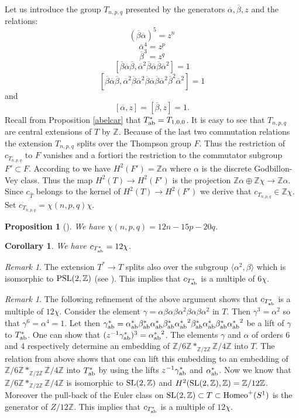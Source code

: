 \documentclass[twoside]{irmaems}
\theoremstyle{plain}
\newtheorem{corollary}[theorem]{Corollary}
\newtheorem{proposition}[theorem]{Proposition}
\theoremstyle{definition}
\theoremstyle{remark}
\newtheorem{remark}[theorem]{Remark}
\newcommand{\Z}{{\mathbb{Z}}}
\newcommand{\als}{{\overline{\alpha}}}
\newcommand{\bls}{{\overline{\beta}}}
\begin{document}
\vspace{0.2cm}
\noindent
Let us introduce the group $T_{n,p,q}$ presented by  the generators  
$\als, \bls, z$ and the relations: 
\[ (\bls\als)^5=z^n \]  
\[ \als^4=z^p \]
\[ \bls^3=z^q\]
\[ [\bls\als\bls, \als^2\bls\als\bls\als^2]=1\]
\[[\bls\als\bls, \als^2\bls\als^2\bls\als\bls\als^2\bls^2\als^2]=1\]
and
\[ [\als,z]=[\bls,z]=1.\]
Recall from Proposition \ref{abelcar} 
that $T^*_{\rm ab}=T_{1,0,0}$. It is easy to see that $T_{n,p,q}$ are central extensions 
of $T$ by $\Z$.  Because of the last two commutation relations the extension 
$T_{n,p,q}$ splits over the Thompson group $F$. 
Thus the restriction of $c_{T_{n,p,q}}$ to $F$ vanishes and 
a fortiori the restriction to the commutator subgroup  $F'\subset F$.   
According to \cite{gh-se} we have $H^2(F')=\Z\alpha$ where 
$\alpha$ is the discrete  Godbillon-Vey class. Thus the map 
$H^2(T)\to H^2(F')$ is the projection $\Z\alpha\oplus \Z\chi\to \Z\alpha$. 
Since $c_{\widehat{T}}$ belongs to the 
kernel of $H^2(T)\to H^2(F')$ we derive that 
$c_{T_{n,p,q}}\in \Z\chi$. Set $c_{T_{n,p,q}}=\chi(n,p,q) \chi$. 


\begin{proposition}[\cite{fu-se}]\label{linearform}
We have $\chi(n,p,q)= 12n-15p-20q$. 
\end{proposition}

\begin{corollary}\label{12}
We have $c_{T^*_{\rm ab}}=12\chi$. 
\end{corollary}

\begin{remark}
The extension $T^*\to T$ splits also 
over the subgroup $\langle \alpha^2,\beta\rangle$ which is isomorphic to ${\rm PSL}(2,\Z)$ 
(see \cite{fu-ka2}). This implies that $c_{T^*_{\rm ab}}$ is a multiple of $6\chi$.  
\end{remark}

\begin{remark}
The following refinement of the above argument shows that 
 $c_{T^*_{\rm ab}}$ is a multiple of $12\chi$.  
Consider the element $\gamma=\alpha\beta\alpha\beta\alpha^2\beta\alpha\beta\alpha^2$ in $T$. Then $\gamma^3=\alpha^2$ so that $\gamma^6=\alpha^4=1$. 
Let then 
$\gamma^*_{\rm ab}=\alpha^*_{\rm ab}\beta^*_{\rm ab}\alpha^*_{\rm ab}\beta^*_{\rm ab}
{\alpha^*_{\rm ab}}^2\beta^*_{\rm ab}\alpha^*_{\rm ab}\beta^*_{\rm ab}{\alpha^*_{\rm ab}}^2$ be a lift of $\gamma$ to $T^*_{\rm ab}$. One can show that 
$(z^{-1}\gamma^*_{\rm ab})^3={\alpha^*_{\rm ab}}^2$. 
The elements $\gamma$ and $\alpha$ of orders 6 and 4 respectively 
determine an embedding of $\Z/6\Z *_{\Z/2\Z}\Z/4\Z$ into $T$. 
The relation from above shows that one can lift this embedding
to an embedding of  $\Z/6\Z *_{\Z/2\Z}\Z/4\Z$ into $T^*_{\rm ab}$ 
by using the lifts $z^{-1}\gamma^*_{\rm ab}$ and $\alpha^*_{\rm ab}$. 
Now we know that $\Z/6\Z *_{\Z/2\Z}\Z/4\Z$ is isomorphic to ${\rm SL}(2,\Z)$ and 
$H^2({\rm SL}(2,\Z),\Z)=\Z/12\Z$. Moreover the pull-back of the Euler 
class on ${\rm SL}(2,\Z) \subset T\subset {\rm Homeo}^+(S^1)$ is the generator 
of $Z/12\Z$. This implies that  $c_{T^*_{\rm ab}}$ is a multiple of $12\chi$.
\end{remark}
\end{document}

